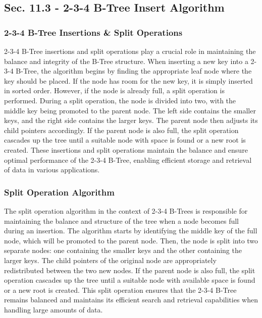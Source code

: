 \subsection*{Sec. 11.3 - 2-3-4 B-Tree Insert Algorithm}

\subsubsection{2-3-4 B-Tree Insertions \& Split Operations}

2-3-4 B-Tree insertions and split operations play a crucial role in maintaining the balance and integrity of the B-Tree structure. When inserting a new key into a 2-3-4 B-Tree, the algorithm begins by finding the appropriate leaf node where the key should be placed. If the node has room for the new key, it is simply inserted in sorted order. 
However, if the node is already full, a split operation is performed. During a split operation, the node is divided into two, with the middle key being promoted to the parent node. The left side contains the smaller keys, and the right side contains the larger keys. The parent node then adjusts its child pointers accordingly. If the parent node is 
also full, the split operation cascades up the tree until a suitable node with space is found or a new root is created. These insertions and split operations maintain the balance and ensure optimal performance of the 2-3-4 B-Tree, enabling efficient storage and retrieval of data in various applications.

\subsubsection{Split Operation Algorithm}

The split operation algorithm in the context of 2-3-4 B-Trees is responsible for maintaining the balance and structure of the tree when a node becomes full during an insertion. The algorithm starts by identifying the middle key of the full node, which will be promoted to the parent node. Then, the node is split into two separate nodes: one containing
the smaller keys and the other containing the larger keys. The child pointers of the original node are appropriately redistributed between the two new nodes. If the parent node is also full, the split operation cascades up the tree until a suitable node with available space is found or a new root is created. This split operation ensures 
that the 2-3-4 B-Tree remains balanced and maintains its efficient search and retrieval capabilities when handling large amounts of data.

